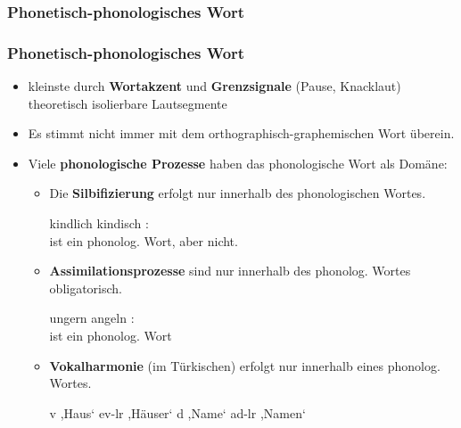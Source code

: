 \subsubsection{Phonetisch-phonologisches Wort}


\begin{frame}
\frametitle{Phonetisch-phonologisches Wort}

\begin{itemize}
	\item kleinste durch \textbf{Wortakzent} und \textbf{Grenzsignale} (Pause, Knacklaut) theoretisch isolierbare Lautsegmente
	\item Es stimmt nicht immer mit dem orthographisch-graphemischen Wort überein.

\pause 
	
	\item Viele \textbf{phonologische Prozesse} haben das phonologische Wort als Domäne:
	
	\begin{itemize}
		\item Die \textbf{Silbifizierung} erfolgt nur innerhalb des phonologischen Wortes.
		
		\ea kindlich  \vs kindisch :\\
		 ist ein phonolog. Wort, aber  nicht.
		\z 

\pause 

		\item \textbf{Assimilationsprozesse} sind nur innerhalb des phonolog. Wortes obligatorisch.
		
		\ea ungern \textipa{[PU\alertred{n.g}E\;Rn]} \vs angeln \textipa{[Pa\alertred{\.{N}}@ln]}:\\
		 ist ein phonolog. Wort
		\z 

\pause 
		
		\item \textbf{Vokalharmonie} (\zB im Türkischen) erfolgt nur innerhalb eines phonolog. Wortes.
		
		\eal
		\ex {}v ,Haus` \ras ev-lr ,Häuser`
		\ex {}d ,Name` \ras ad-lr ,Namen`
		\zl
		
	\end{itemize}
\end{itemize}

\end{frame}


